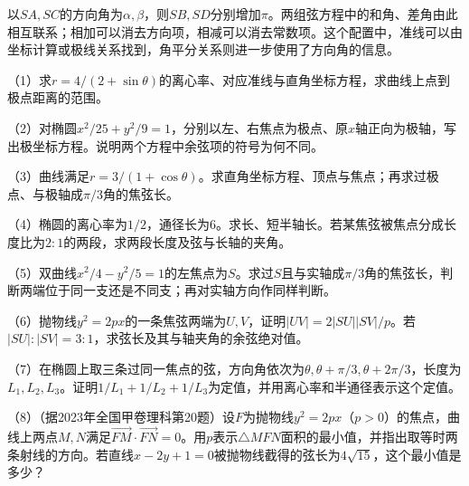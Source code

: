 以\(SA,SC\)的方向角为\(\alpha,\beta\)，则\(SB,SD\)分别增加\(\pi\)。两组弦方程中的和角、差角由此相互联系；相加可以消去方向项，相减可以消去常数项。这个配置中，准线可以由坐标计算或极线关系找到，角平分关系则进一步使用了方向角的信息。

\begingroup
\setlength{\parskip}{4pt}
\begin{exercise}
\mbox{}\par\nobreak
\begin{samepage}
（1）求\(r=4/(2+\sin\theta)\)的离心率、对应准线与直角坐标方程，求曲线上点到极点距离的范围。
\par\end{samepage}
\begin{samepage}
（2）对椭圆\(x^2/25+y^2/9=1\)，分别以左、右焦点为极点、原\(x\)轴正向为极轴，写出极坐标方程。说明两个方程中余弦项的符号为何不同。
\par\end{samepage}
\begin{samepage}
（3）曲线满足\(r=3/(1+\cos\theta)\)。求直角坐标方程、顶点与焦点；再求过极点、与极轴成\(\pi/3\)角的焦弦长。
\par\end{samepage}
\begin{samepage}
（4）椭圆的离心率为\(1/2\)，通径长为\(6\)。求长、短半轴长。若某焦弦被焦点分成长度比为\(2:1\)的两段，求两段长度及弦与长轴的夹角。
\par\end{samepage}
\begin{samepage}
（5）双曲线\(x^2/4-y^2/5=1\)的左焦点为\(S\)。求过\(S\)且与实轴成\(\pi/3\)角的焦弦长，判断两端位于同一支还是不同支；再对实轴方向作同样判断。
\par\end{samepage}
\begin{samepage}
（6）抛物线\(y^2=2px\)的一条焦弦两端为\(U,V\)，证明\(|UV|=2|SU||SV|/p\)。若\(|SU|:|SV|=3:1\)，求弦长及其与轴夹角的余弦绝对值。
\par\end{samepage}
\begin{samepage}
（7）在椭圆上取三条过同一焦点的弦，方向角依次为\(\theta,\theta+\pi/3,\theta+2\pi/3\)，长度为\(L_1,L_2,L_3\)。证明\(1/L_1+1/L_2+1/L_3\)为定值，并用离心率和半通径表示这个定值。
\par\end{samepage}
\begin{samepage}
（8）（据2023年全国甲卷理科第20题）设\(F\)为抛物线\(y^2=2px\)（\(p>0\)）的焦点，曲线上两点\(M,N\)满足\(\overrightarrow{FM}\cdot\overrightarrow{FN}=0\)。用\(p\)表示\(\triangle MFN\)面积的最小值，并指出取等时两条射线的方向。若直线\(x-2y+1=0\)被抛物线截得的弦长为\(4\sqrt{15}\)，这个最小值是多少？
\par\end{samepage}


\end{exercise}
